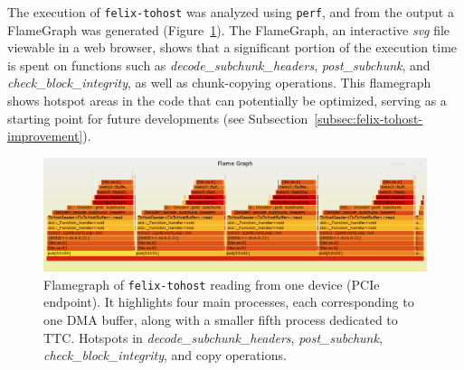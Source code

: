 The execution of \texttt{felix-tohost} was analyzed using \texttt{perf}, and from the output a FlameGraph \cite{flamegraph} was generated (Figure~\ref{fig:felix-tohost-flamegraph}). The FlameGraph, an interactive \emph{svg} file viewable in a web browser, shows that a significant portion of the execution time is spent on functions such as \emph{decode\_subchunk\_headers}, \emph{post\_subchunk}, and \emph{check\_block\_integrity}, as well as chunk-copying operations. This flamegraph shows hotspot areas in the code that can potentially be optimized, serving as a starting point for future developments (see Subsection~\ref{subsec:felix-tohost-improvement}).

\begin{figure}[htbp]
\centering
\includegraphics[width=\textwidth]{images/results/flamegraph.png}
\caption[Flamegraph of felix-tohost]{Flamegraph of \texttt{felix-tohost} reading from one device (PCIe endpoint). It highlights four main processes, each corresponding to one \acs{DMA} buffer, along with a smaller fifth process dedicated to \acs{TTC}. 
Hotspots in \emph{decode\_subchunk\_headers}, \emph{post\_subchunk}, \emph{check\_block\_integrity}, and copy operations.}
\label{fig:felix-tohost-flamegraph}
\end{figure}